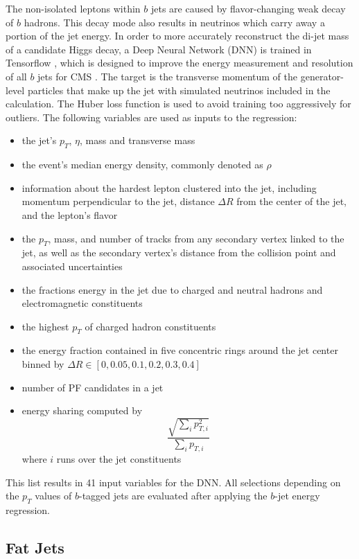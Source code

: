 The non-isolated leptons within $b$ jets are caused
by flavor-changing weak decay of $b$ hadrons.
This decay mode also results in neutrinos which carry away a portion of the jet energy.
In order to more accurately reconstruct the di-jet mass of a candidate Higgs decay,
a Deep Neural Network (DNN) is trained in Tensorflow
\cite{DBLP:journals/corr/AbadiABBCCCDDDG16},
which is designed to improve the energy measurement and resolution of all $b$ jets for CMS
\cite{collaboration2019deep}.
The target is the transverse momentum of the generator-level particles that make up the jet
with simulated neutrinos included in the calculation.
The Huber loss function is used to avoid training too aggressively for outliers.
The following variables are used as inputs to the regression:
\begin{itemize}
\item the jet's $p_T$, $\eta$, mass and transverse mass
\item the event's median energy density, commonly denoted as $\rho$
\item information about the hardest lepton clustered into the jet,
  including momentum perpendicular to the jet,
  distance $\Delta R$ from the center of the jet,
  and the lepton's flavor
\item the $p_T$, mass, and number of tracks from any secondary vertex linked to the jet,
  as well as the secondary vertex's distance from the collision point and
  associated uncertainties
\item the fractions energy in the jet due to
  charged and neutral hadrons and electromagnetic constituents
\item the highest $p_T$ of charged hadron constituents
\item the energy fraction contained in five concentric rings around the jet center
  binned by $\Delta R \in [0, 0.05, 0.1, 0.2, 0.3, 0.4]$
\item number of PF candidates in a jet
\item energy sharing computed by
  \[
  \frac{\sqrt{\sum_i p_{T,i}^2}}{\sum_i p_{T,i}}
  \]
  where $i$ runs over the jet constituents
\end{itemize}
This list results in 41 input variables for the DNN.
All selections depending on the $p_T$ values of $b$-tagged jets are evaluated after
applying the $b$-jet energy regression.

\subsection{Fat Jets}

